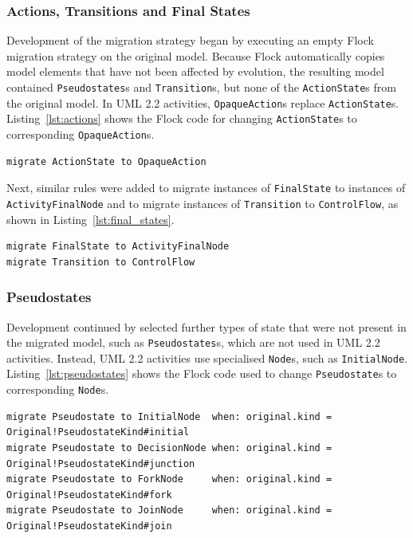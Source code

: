\subsubsection{Actions, Transitions and Final States}
Development of the migration strategy began by executing an empty Flock migration strategy on the original model. Because Flock automatically copies model elements that have not been affected by evolution, the resulting model contained \texttt{Pseudostates}s and \texttt{Transition}s, but none of the \texttt{ActionState}s from the original model. In UML 2.2 activities, \texttt{OpaqueAction}s replace \texttt{ActionState}s. Listing~\ref{lst:actions} shows the Flock code for changing \texttt{ActionState}s to corresponding \texttt{OpaqueAction}s.

\begin{lstlisting}[caption=Migrating Actions, label=lst:actions, language=Flock]
migrate ActionState to OpaqueAction
\end{lstlisting}

Next, similar rules were added to migrate instances of \texttt{FinalState} to instances of \texttt{ActivityFinalNode} and to migrate instances of \texttt{Transition} to \texttt{ControlFlow}, as shown in Listing~\ref{lst:final_states}.

\begin{lstlisting}[caption=Migrating FinalStates and Transitions, label=lst:final_states, language=Flock]
migrate FinalState to ActivityFinalNode
migrate Transition to ControlFlow
\end{lstlisting}

\subsubsection{Pseudostates}
Development continued by selected further types of state that were not present in the migrated model, such as \texttt{Pseudostates}s, which are not used in UML 2.2 activities. Instead, UML 2.2 activities use specialised \texttt{Node}s, such as \texttt{InitialNode}. Listing~\ref{lst:pseudostates} shows the Flock code used to change \texttt{Pseudostate}s to corresponding \texttt{Node}s.

\begin{lstlisting}[caption=Migrating Pseudostates, label=lst:pseudostates, language=Flock]
migrate Pseudostate to InitialNode  when: original.kind = Original!PseudostateKind#initial
migrate Pseudostate to DecisionNode when: original.kind = Original!PseudostateKind#junction
migrate Pseudostate to ForkNode     when: original.kind = Original!PseudostateKind#fork
migrate Pseudostate to JoinNode     when: original.kind = Original!PseudostateKind#join
\end{lstlisting}

